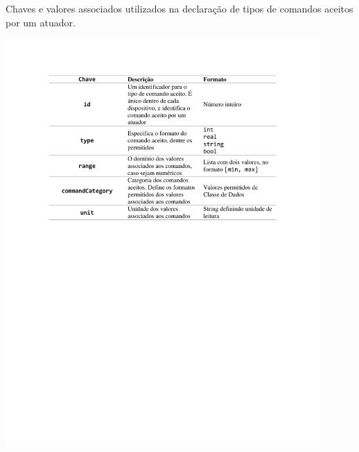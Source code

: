 \begin{table}[hp]
	\centering
	\caption{Chaves e valores associados utilizados na declaração de tipos de comandos aceitos por um atuador.}\smallskip
	\label{tab:commandtype}
	\includegraphics[width=0.9\textwidth]{tabelas/commandtype.pdf}
	
	\medskip
	

\end{table}
